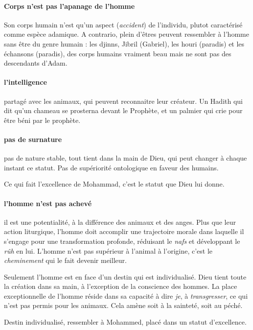 

\paragraph{Corps n'est pas l'apanage de l'homme}
Son corps humain n'est qu'un aspect (\textit{accident}) de l'individu, plutot caractérisé comme espèce adamique.
A contrario, plein d'êtres peuvent ressembler à l'homme sans être du genre humain : les djinns, Jibril (Gabriel), les houri (paradis) et les échansons (paradis), des corps humains vraiment beau mais ne sont pas des descendants d'Adam.

\paragraph{l'intelligence} partagé avec les animaux, qui peuvent reconnaitre leur créateur. Un Hadith qui dit qu'un chameau se prosterna devant le Prophète, et un palmier qui crie pour être béni par le prophète.


\paragraph{pas de surnature} pas de nature stable, tout tient dans la main de Dieu, qui peut changer à chaque instant ce statut. Pas de supériorité ontologique en faveur des humains. 

Ce qui fait l'excellence de Mohammad, c'est le statut que Dieu lui donne.

\paragraph{l'homme n'est pas achevé} il est une potentialité, à la différence des animaux et des anges. Plus que leur action liturgique, l'homme doit accomplir une trajectoire morale dans laquelle il s'engage pour une transformation profonde, réduisant le \textit{nafs} et développant le \textit{rûh} en lui.
L'homme n'est pas supérieur à l'animal à l'origine, c'est le \textit{cheminement} qui le fait devenir meilleur.


Seulement l'homme est en face d'un destin qui est individualisé. 
Dieu tient toute la création dans sa main, à l'exception de la conscience des hommes. La place exceptionnelle de l'homme réside dans sa capacité à dire \textit{je}, à \textit{transgresser}, ce qui n'est pas permis pour les animaux. Cela amène soit à la sainteté, soit au péché. 
\begin{Synthesis}
Destin individualisé, ressembler à Mohammed, placé dans un statut d'excellence. 
\end{Synthesis}












